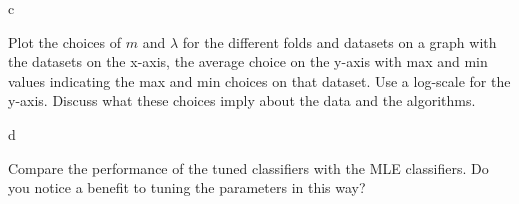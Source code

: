 \documentclass[fleqn]{homework}
\begin{document}
  \begin{problem}{c}
    \begin{question}
      Plot the choices of $m$ and $\lambda$ for the different folds and datasets
      on a graph with the datasets on the x-axis, the average choice on the
      y-axis with max and min values indicating the max and min choices on that
      dataset.  Use a log-scale for the y-axis.  Discuss what these choices
      imply about the data and the algorithms.
    \end{question}
  \end{problem}

  \begin{problem}{d}
    \begin{question}
      Compare the performance of the tuned classifiers with the MLE classifiers.
      Do you notice a benefit to tuning the parameters in this way?
    \end{question}
  \end{problem}
\end{document}
